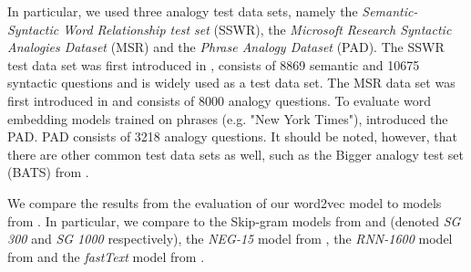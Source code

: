 In particular, we used three analogy test data sets, namely the \textit{Semantic-Syntactic Word Relationship test set} (SSWR), the \textit{Microsoft Research Syntactic Analogies Dataset} (MSR) and the \textit{Phrase Analogy Dataset} (PAD). The SSWR test data set was first introduced in \cite{mikolov2013a}, consists of 8869 semantic and 10675 syntactic questions and is widely used as a test data set. The MSR data set was first introduced in \cite{mikolov-etal-2013-linguistic} and consists of 8000 analogy questions. To evaluate word embedding models trained on phrases (e.g. "New York Times"), \cite{mikolov2013b} introduced the PAD. PAD consists of 3218 analogy questions. It should be noted, however, that there are other common test data sets as well, such as the Bigger analogy test set (BATS) from \cite{gladkova-etal-2016-analogy}.

We compare the results from the evaluation of our word2vec model to models from \cite{mikolov2013a, mikolov2013b, mikolov-etal-2013-linguistic, bojanowski2017enriching}. In particular, we compare to the Skip-gram models from \cite[Table 3]{mikolov2013a} and \cite[Table 6]{mikolov2013a} (denoted \textit{SG 300} and \textit{SG 1000} respectively), the \textit{NEG-15} model from \cite[Table 1 and 3]{mikolov2013b}, the \textit{RNN-1600} model from \cite[Table 2]{mikolov-etal-2013-linguistic} and the \textit{fastText} model from \cite[Table 2]{bojanowski2017enriching}.

